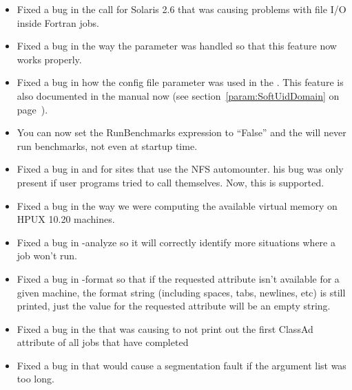 \begin{itemize}

\item Fixed a bug in the  call for Solaris 2.6 that was
causing problems with file I/O inside Fortran jobs.

\item Fixed a bug in the way the 
parameter was handled so that this feature now works properly.  

\item Fixed a bug in how the  config file
parameter was used in the .
This feature is also documented in the manual now (see
section~\ref{param:SoftUidDomain} on
page~\pageref{param:SoftUidDomain}).

\item You can now set the RunBenchmarks expression to ``False'' and
the  will never run benchmarks, not even at startup
time. 

\item Fixed a bug in  and  for sites
that use the NFS automounter.
his bug was only present if user programs tried to call
 themselves.
Now, this is supported. 

\item Fixed a bug in the way we were computing the available virtual
memory on HPUX 10.20 machines.

\item Fixed a bug in  -analyze so it will correctly identify
more situations where a job won't run.

\item Fixed a bug in  -format so that if the requested 
attribute isn't available for a given machine, the format string
(including spaces, tabs, newlines, etc) is still printed, just the
value for the requested attribute will be an empty string. 

\item Fixed a bug in the  that was causing
 to not print out the first ClassAd attribute of all
jobs that have completed

\item Fixed a bug in  that would cause a segmentation fault
if the argument list was too long.

\end{itemize}

